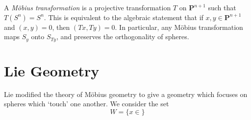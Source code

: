A \emph{M\"{o}bius transformation} is a projective transformation $T$ on $\mathbf{P}^{n+1}$ such that $T(S^n) = S^n$. This is equivalent to the algebraic statement that if $x,y \in \mathbf{P}^{n+1}$ and $(x,y) = 0$, then $(Tx,Ty) = 0$. In particular, any M\"{o}bius transformation maps $S_y$ onto $S_{Ty}$, and preserves the orthogonality of spheres.

\chapter{Lie Geometry}

Lie modified the theory of M\"{o}bius geometry to give a geometry which focuses on spheres which `touch' one another. We consider the set
%
\[ W = \{ x \in  \} \]


